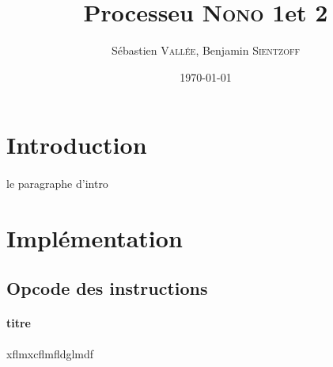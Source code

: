 \documentclass[a4paper]{article}
\title{Processeu \textsc{Nono} 1et 2}
\author{Sébastien \textsc{Vallée}, Benjamin \textsc{Sientzoff}}
\date{\today}
\begin{document}
	\maketitle
	\vspace{5cm}
	\tableofcontents
	\newpage %
	
	\section*{Introduction}
	\paragraph{}{le paragraphe d'intro}
	
	\section{Implémentation}
	
		\subsection{Opcode des instructions}
			
			\paragraph{titre }{xflmxcflmfldglmdf}
			
\end{document}
